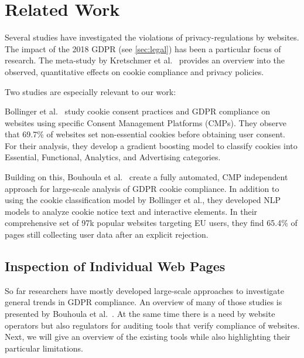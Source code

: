 \chapter{Related Work}

Several studies have investigated the violations of privacy-regulations by websites.
The impact of the 2018 GDPR (see \cref{sec:legal}) has been a particular focus of research.
The meta-study by Kretschmer et al.~\cite{kretschmer2021cookie} provides an overview into the observed, quantitative effects on cookie compliance and privacy policies.

Two studies are especially relevant to our work:

Bollinger et al.~\cite{bollinger2022automating} study cookie consent practices and GDPR compliance on websites using specific Consent Management Platforms (CMPs). 
They observe that 69.7\% of websites set non-essential cookies before obtaining user consent. 
For their analysis, they develop a gradient boosting model to classify cookies into Essential, Functional, Analytics, and Advertising categories.

Building on this, Bouhoula et al.~\cite{bouhoula2023automated} create a fully automated, CMP independent approach for large-scale analysis of GDPR cookie compliance. 
In addition to using the cookie classification model by Bollinger et al., they developed NLP models to analyze cookie notice text and interactive elements. 
In their comprehensive set of 97k popular websites targeting EU users, they find 65.4\% of pages still collecting user data after an explicit rejection.


\section{Inspection of Individual Web Pages}
So far researchers have mostly developed large-scale approaches to investigate general trends in GDPR compliance. 
An overview of many of those studies is presented by Bouhoula et al.~\cite{bouhoula2023automated}.
At the same time there is a need by website operators but also regulators for auditing tools that verify compliance of websites.
Next, we will give an overview of the existing tools while also highlighting their particular limitations.


